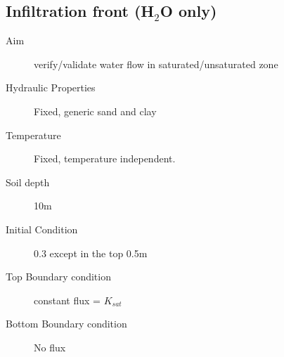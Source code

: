 \documentclass[twoside,10pt]{report}
\begin{document}





\subsection{Infiltration front (H$_2$O only)}
\begin{description}
\item [Aim]  verify/validate water flow in saturated/unsaturated zone
\item [Hydraulic Properties] Fixed, generic sand and clay
\item [Temperature] Fixed, temperature independent.
\item [Soil depth] 10m
\item [Initial Condition] 0.3 except in the top 0.5m
\item [Top Boundary condition] constant flux = $K_{sat}$
\item [Bottom Boundary condition] No flux
\end{description}
\end{document}
